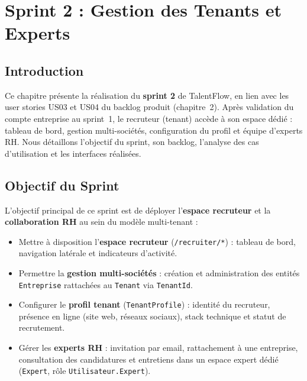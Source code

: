 \chapter{Sprint 2 : Gestion des Tenants et Experts}

\section*{Introduction}

Ce chapitre présente la réalisation du \textbf{sprint 2} de TalentFlow, en lien avec
les user stories US03 et US04 du backlog produit (chapitre~2). Après validation du
compte entreprise au sprint~1, le recruteur (tenant) accède à son espace dédié :
tableau de bord, gestion multi-sociétés, configuration du profil et équipe d'experts RH.
Nous détaillons l'objectif du sprint, son backlog, l'analyse des cas d'utilisation
et les interfaces réalisées.

\section{Objectif du Sprint}

L'objectif principal de ce sprint est de déployer l'\textbf{espace recruteur} et la
\textbf{collaboration RH} au sein du modèle multi-tenant :

\begin{itemize}
    \item Mettre à disposition l'\textbf{espace recruteur} (\texttt{/recruiter/*}) :
    tableau de bord, navigation latérale et indicateurs d'activité.

    \item Permettre la \textbf{gestion multi-sociétés} : création et administration des
    entités \texttt{Entreprise} rattachées au \texttt{Tenant} via \texttt{TenantId}.

    \item Configurer le \textbf{profil tenant} (\texttt{TenantProfile}) : identité du
    recruteur, présence en ligne (site web, réseaux sociaux), stack technique et
    statut de recrutement.

    \item Gérer les \textbf{experts RH} : invitation par email, rattachement à une
    entreprise, consultation des candidatures et entretiens dans un espace expert dédié
    (\texttt{Expert}, rôle \texttt{Utilisateur.Expert}).
\end{itemize}

